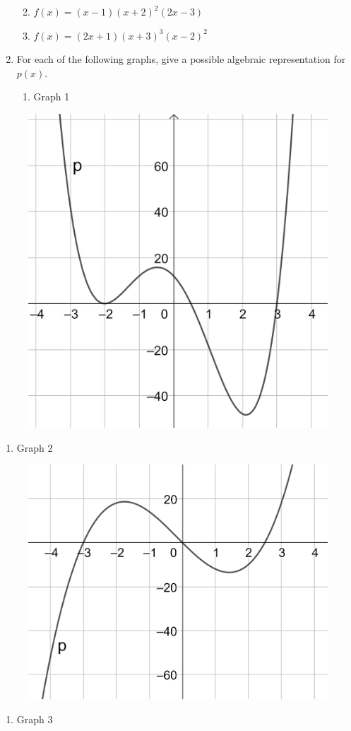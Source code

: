 \documentclass[
]{book}
\providecommand{\tightlist}{%
  \setlength{\itemsep}{0pt}\setlength{\parskip}{0pt}}
\theoremstyle{definition}
\theoremstyle{definition}
\theoremstyle{definition}
\theoremstyle{remark}
\begin{document}
\begin{enumerate}
  \begin{enumerate}
  \def\labelenumii{\alph{enumii}.}
  \tightlist
  \item
    \({\displaystyle f(x)=(x-1)(x+2)^2(2x-3)}\)
  \item
    \({\displaystyle f(x)=(2x+1)(x+3)^3(x-2)^2}\)
  \end{enumerate}
\item
  For each of the following graphs, give a possible algebraic representation for \(p(x)\).

  \begin{enumerate}
  \def\labelenumii{\alph{enumii}.}
  \tightlist
  \item
    Graph 1
  \end{enumerate}
\end{enumerate}

\begin{figure}

{\centering \includegraphics[width=0.3\linewidth]{images/polygraph1} 

}

\end{figure}

\begin{enumerate}
\def\labelenumi{\alph{enumi}.}
\tightlist
\item
  Graph 2
\end{enumerate}

\begin{figure}

{\centering \includegraphics[width=0.3\linewidth]{images/polygraph2} 

}

\end{figure}

\begin{enumerate}
\def\labelenumi{\alph{enumi}.}
\tightlist
\item
  Graph 3
\end{enumerate}
\end{document}
